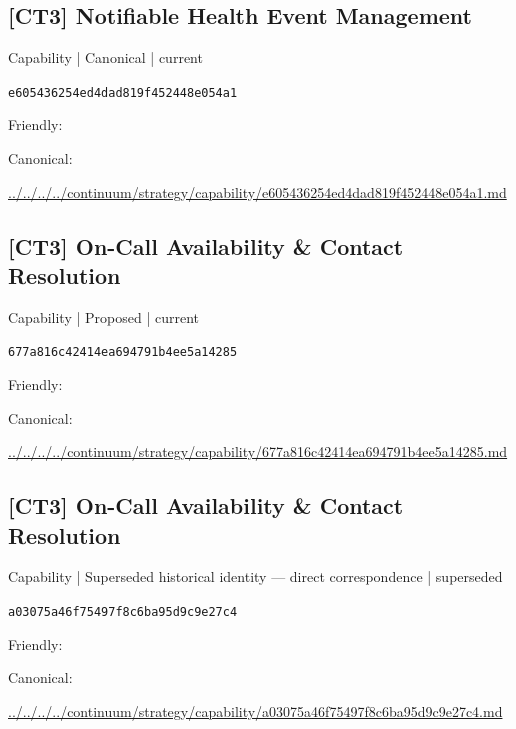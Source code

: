 \documentclass[10pt,a4paper]{article}
\begin{document}
\subsection*{[CT3] Notifiable Health Event Management}
{\small Capability | Canonical | current}\par
\texttt{e605436254ed4dad819f452448e054a1}\par
Friendly: \par
Canonical: \par
{\footnotesize\url{../../../../continuum/strategy/capability/e605436254ed4dad819f452448e054a1.md}}\par
\subsection*{[CT3] On-Call Availability \& Contact Resolution}
{\small Capability | Proposed | current}\par
\texttt{677a816c42414ea694791b4ee5a14285}\par
Friendly: \par
Canonical: \par
{\footnotesize\url{../../../../continuum/strategy/capability/677a816c42414ea694791b4ee5a14285.md}}\par
\subsection*{[CT3] On-Call Availability \& Contact Resolution}
{\small Capability | Superseded historical identity — direct correspondence | superseded}\par
\texttt{a03075a46f75497f8c6ba95d9c9e27c4}\par
Friendly: \par
Canonical: \par
{\footnotesize\url{../../../../continuum/strategy/capability/a03075a46f75497f8c6ba95d9c9e27c4.md}}\par
\end{document}
